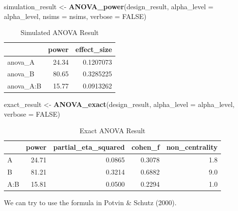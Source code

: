 \documentclass[]{book}
\newenvironment{Shaded}{\begin{snugshade}}{\end{snugshade}}
\newcommand{\DataTypeTok}[1]{\textcolor[rgb]{0.13,0.29,0.53}{#1}}
\newcommand{\KeywordTok}[1]{\textcolor[rgb]{0.13,0.29,0.53}{\textbf{#1}}}
\newcommand{\NormalTok}[1]{#1}
\newcommand{\OtherTok}[1]{\textcolor[rgb]{0.56,0.35,0.01}{#1}}
\newcommand{\StringTok}[1]{\textcolor[rgb]{0.31,0.60,0.02}{#1}}
\begin{document}
\begin{Shaded}
\begin{Highlighting}[]
\NormalTok{simulation_result <-}\StringTok{ }\KeywordTok{ANOVA_power}\NormalTok{(design_result, }
                                 \DataTypeTok{alpha_level =}\NormalTok{ alpha_level, }
                                 \DataTypeTok{nsims =}\NormalTok{ nsims,}
                                 \DataTypeTok{verbose =} \OtherTok{FALSE}\NormalTok{)}
\end{Highlighting}
\end{Shaded}

\begin{table}[t]

\caption{\label{tab:unnamed-chunk-164}Simulated ANOVA Result}
\centering
\begin{tabular}{l|r|r}
\hline
  & power & effect\_size\\
\hline
anova\_A & 24.34 & 0.1207073\\
\hline
anova\_B & 80.65 & 0.3285225\\
\hline
anova\_A:B & 15.77 & 0.0913262\\
\hline
\end{tabular}
\end{table}

\begin{Shaded}
\begin{Highlighting}[]
\NormalTok{exact_result <-}\StringTok{ }\KeywordTok{ANOVA_exact}\NormalTok{(design_result,}
                            \DataTypeTok{alpha_level =}\NormalTok{ alpha_level,}
                            \DataTypeTok{verbose =} \OtherTok{FALSE}\NormalTok{)}
\end{Highlighting}
\end{Shaded}

\begin{table}[t]

\caption{\label{tab:unnamed-chunk-166}Exact ANOVA Result}
\centering
\begin{tabular}{l|r|r|r|r}
\hline
  & power & partial\_eta\_squared & cohen\_f & non\_centrality\\
\hline
A & 24.71 & 0.0865 & 0.3078 & 1.8\\
\hline
B & 81.21 & 0.3214 & 0.6882 & 9.0\\
\hline
A:B & 15.81 & 0.0500 & 0.2294 & 1.0\\
\hline
\end{tabular}
\end{table}

We can try to use the formula in Potvin \& Schutz (2000).
\end{document}
